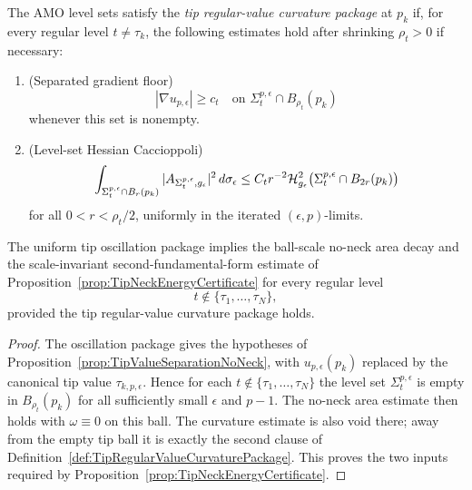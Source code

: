 \begin{definition}
\label{def:TipRegularValueCurvaturePackage}
The AMO level sets satisfy the \emph{tip regular-value curvature package} at
\(p_k\) if, for every regular level \(t\ne\tau_k\), the following estimates
hold after shrinking \(\rho_t>0\) if necessary:
\begin{enumerate}
    \item \textup{(Separated gradient floor)}
    \[
        |\nabla u_{p,\epsilon}|
        \ge c_t
        \quad\text{on }
        \Sigma_t^{p,\epsilon}\cap B_{\rho_t}(p_k)
    \]
    whenever this set is nonempty.
    \item \textup{(Level-set Hessian Caccioppoli)}
    \[
        \int_{\Sigma_t^{p,\epsilon}\cap B_r(p_k)}
        |A_{\Sigma_t^{p,\epsilon},g_{\epsilon}}|^2\,d\sigma_\epsilon
        \le
        C_t r^{-2}
        \mathcal H^2_{g_{\epsilon}}
        \bigl(\Sigma_t^{p,\epsilon}\cap B_{2r}(p_k)\bigr)
    \]
    for all \(0<r<\rho_t/2\), uniformly in the iterated
    \((\epsilon,p)\)-limits.
\end{enumerate}
\end{definition}

\begin{proposition}
\label{prop:OscillationPackageNoNeck}
The uniform tip oscillation package implies the ball-scale no-neck area decay
and the scale-invariant second-fundamental-form estimate of
Proposition~\ref{prop:TipNeckEnergyCertificate} for every regular level
\[
    t\notin\{\tau_1,\ldots,\tau_N\},
\]
provided the tip regular-value curvature package holds.
\end{proposition}

\begin{proof}
The oscillation package gives the hypotheses of
Proposition~\ref{prop:TipValueSeparationNoNeck}, with
\(u_{p,\epsilon}(p_k)\) replaced by the canonical tip value
\(\tau_{k,p,\epsilon}\).  Hence for each
\(t\notin\{\tau_1,\ldots,\tau_N\}\) the level set
\(\Sigma_t^{p,\epsilon}\) is empty in \(B_{\rho_t}(p_k)\) for all sufficiently
small \(\epsilon\) and \(p-1\).  The no-neck area estimate then holds with
\(\omega\equiv0\) on this ball.  The curvature estimate is also void there;
away from the empty tip ball it is exactly the second clause of
Definition~\ref{def:TipRegularValueCurvaturePackage}.  This proves the two
inputs required by Proposition~\ref{prop:TipNeckEnergyCertificate}.
\end{proof}

